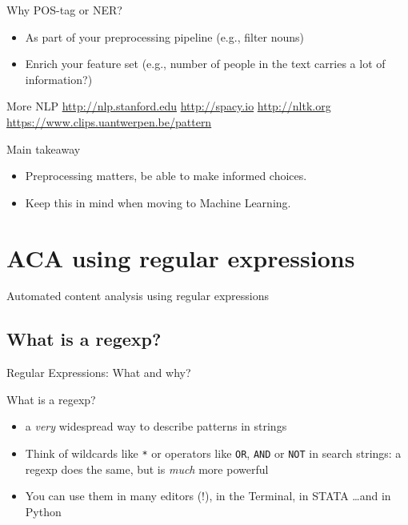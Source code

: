 \documentclass[compress]{beamer}
\begin{document}
\begin{frame}{Why POS-tag or NER?}
\begin{itemize}
    \item As part of your preprocessing pipeline (e.g., filter nouns)
    \item Enrich your feature set (e.g., number of people in the text carries a lot of information?)
\end{itemize}
\end{frame}


\begin{frame}{More NLP}
\url{http://nlp.stanford.edu}
\url{http://spacy.io}
\url{http://nltk.org}
\url{https://www.clips.uantwerpen.be/pattern}
\end{frame}



\begin{frame}{Main takeaway}

\begin{itemize}
\item Preprocessing matters, be able to make informed choices.
\item Keep this in mind when moving to Machine Learning. 
\end{itemize}
\end{frame}


\section[Regular expressions]{ACA using regular expressions}

\begin{frame}
Automated content analysis using regular expressions
\end{frame}


\subsection{What is a regexp?}
\begin{frame}{Regular Expressions: What and why?}
\begin{block}{What is a regexp?}
\begin{itemize}
\item<1-> a \emph{very} widespread way to describe patterns in strings
\item<2-> Think of wildcards like {\tt{*}} or operators like {\tt{OR}}, {\tt{AND}} or {\tt{NOT}} in search strings: a regexp does the same, but is \emph{much} more powerful
\item<3-> You can use them in many editors (!), in the Terminal, in STATA \ldots and in Python
\end{itemize}
\end{block}
\end{frame}
\end{document}
